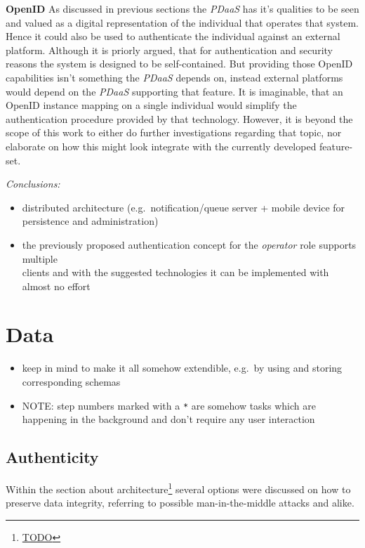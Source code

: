 \documentclass[12pt,english,a4paper,titlepage,cleardoublepage=empty,dottedtoc]{report}
\renewcommand{\href}[2]{#2\footnote{\url{#1}}}
\providecommand{\tightlist}{%
  \setlength{\itemsep}{0pt}\setlength{\parskip}{0pt}}
\begin{document}
\textbf{OpenID} As discussed in previous sections the \emph{PDaaS} has
it's qualities to be seen and valued as a digital representation of the
individual that operates that system. Hence it could also be used to
authenticate the individual against an external platform. Although it is
priorly argued, that for authentication and security reasons the system
is designed to be self-contained. But providing those OpenID
capabilities isn't something the \emph{PDaaS} depends on, instead
external platforms would depend on the \emph{PDaaS} supporting that
feature. It is imaginable, that an OpenID instance mapping on a single
individual would simplify the authentication procedure provided by that
technology. However, it is beyond the scope of this work to either do
further investigations regarding that topic, nor elaborate on how this
might look integrate with the currently developed feature-set.

\emph{Conclusions:}

\begin{itemize}
\tightlist
\item
  distributed architecture (e.g.~notification/queue server + mobile
  device for persistence and administration)
\item
  the previously proposed authentication concept for the \emph{operator}
  role supports multiple\\
  clients and with the suggested technologies it can be implemented with
  almost no effort
\end{itemize}

\section{Data}\label{data}

\begin{itemize}
\item
  keep in mind to make it all somehow extendible, e.g.~by using and
  storing corresponding schemas
\item
  NOTE: step numbers marked with a \texttt{*} are somehow tasks which
  are happening in the background and don't require any user interaction
\end{itemize}

\subsection{Authenticity}\label{authenticity}

Within the section \href{TODO}{about architecture} several options were
discussed on how to preserve data integrity, referring to possible
man-in-the-middle attacks and alike.
\end{document}
